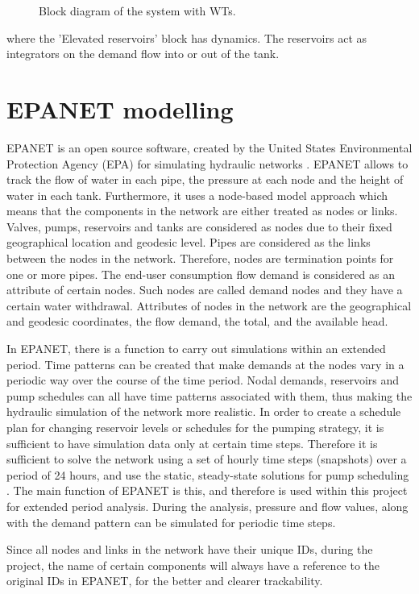 \begin{figure}[H]
\centering
 
\caption{Block diagram of the system with WTs.}
\label{fig:WT_system_blockdiagram}
\end{figure}

where the 'Elevated reservoirs' block has dynamics. The reservoirs act as integrators on the demand flow into or out of the tank. 

\newpage

\section{EPANET modelling}
\label{EPANET_modelling}

EPANET is an open source software, created by the United States Environmental Protection Agency (EPA) for simulating hydraulic networks \cite{agency2016epanet}. EPANET allows to track the flow of water in each pipe, the pressure at each node and the height of water in each tank. Furthermore, it uses a node-based model approach which means that the components in the network are either treated as nodes or links. Valves, pumps, reservoirs and tanks are considered as nodes due to their fixed geographical location and geodesic level. Pipes are considered as the links between the nodes in the network. Therefore, nodes are termination points for one or more pipes. The end-user consumption flow demand is considered as an attribute of certain nodes. Such nodes are called demand nodes and they have a certain water withdrawal. Attributes of nodes in the network are the geographical and geodesic coordinates, the flow demand, the total, and the available head. \cite{agency2016epanet}  

In EPANET, there is a function to carry out simulations within an extended period. Time patterns can be created that make demands at the nodes vary in a periodic way over the course of the time period. Nodal demands, reservoirs and pump schedules can all have time patterns associated with them, thus making the hydraulic simulation of the network more realistic. In order to create a schedule plan for changing reservoir levels or schedules for the pumping strategy, it is sufficient to have simulation data only at certain time steps. Therefore it is sufficient to solve the network using a set of hourly time steps (snapshots) over a period of 24 hours, and use the static, steady-state solutions for pump scheduling \cite{agency2016epanet}. The main function of EPANET is this, and therefore is used within this project for extended period analysis. During the analysis, pressure and flow values, along with the demand pattern can be simulated for periodic time steps. 

Since all nodes and links in the network have their unique IDs, during the project, the name of certain components will always have a reference to the original IDs in EPANET, for the better and clearer trackability. 









